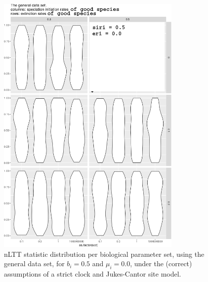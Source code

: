 \documentclass{article}
\begin{document}
\begin{figure}[!htbp]
  \includegraphics[width=0.8\textwidth]{fig_general_4.png}
  \caption{
    nLTT statistic distribution per biological parameter set, using the
    general data set, 
    for $b_i = 0.5$ and $\mu_i = 0.0$, 
    under the (correct) assumptions of a strict clock and Jukes-Cantor site model.
  }
\end{figure}
\end{document}

